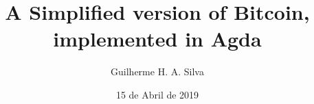 \documentclass[12pt]{article}
\title{A Simplified version of Bitcoin, implemented in Agda}
\author{Guilherme H. A. Silva}
\date{15 de Abril de 2019}
\begin{document}

\firstpage


\tableofcontents
\pagebreak

\listoffigures
\newpage
\renewcommand{\thesection}{\arabic{section}}












\newpage



\end{document}
